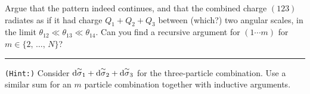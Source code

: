 \begin{exercise}
    \label{ex:charge-coherence-mparticle}
    Argue that the pattern indeed continues, and that the combined charge \((123)\) radiates as if it had charge \(Q_1 + Q_2 + Q_3\) between (which?) two angular scales, in the limit \(\theta_{12} \ll \theta_{13} \ll \theta_{14}\).
    Can you find a recursive argument for \((1\cdots m)\) for \(m \in \{2,\,\dots,\,N\}\)?

    \vspace{7pt}
    \hrule
    \vspace{7pt}

    \texttt{(Hint:)}
    Consider \(\dd\overset{\sim}{\sigma}_1  + \dd\overset{\sim}{\sigma}_2 + \dd\overset{\sim}{\sigma}_3\) for the three-particle combination.
    Use a similar sum for an \(m\) particle combination together with inductive arguments.
\end{exercise}






